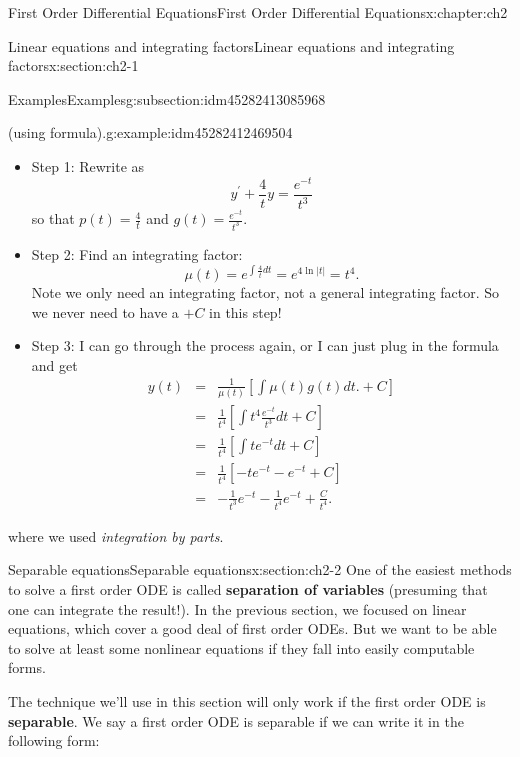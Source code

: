 \documentclass[oneside,10pt,]{book}
\newcommand{\terminology}[1]{\textbf{#1}}
\numberwithin{equation}{section}
\numberwithin{equation}{section}
\newcommand{\amp}{&}
\begin{document}
\begin{chapterptx}{First Order Differential Equations}{}{First Order Differential Equations}{}{}{x:chapter:ch2}
\begin{sectionptx}{Linear equations and integrating factors}{}{Linear equations and integrating factors}{}{}{x:section:ch2-1}
\begin{subsectionptx}{Examples}{}{Examples}{}{}{g:subsection:idm45282413085968}
\begin{example}{(using formula).}{g:example:idm45282412469504}
%
%
\begin{itemize}[label=\textbullet]
\item{}Step 1: Rewrite as%
\begin{equation*}
y^{\prime}+\frac{4}{t}y=\frac{e^{-t}}{t^{3}}
\end{equation*}
so that \(p(t)=\frac{4}{t}\) and \(g(t)=\frac{e^{-t}}{t^{3}}\).%
\item{}Step 2: Find an integrating factor:%
\begin{equation*}
\mu(t)=e^{\int\frac{4}{t}dt}=e^{4\ln\left|t\right|}=t^{4}.
\end{equation*}
Note we only need an integrating factor, not a general integrating factor. So we never need to have a \(+C\) in this step!%
\item{}Step 3: I can go through the process again, or I can just plug in the formula and get%
\begin{align*}
y(t) \amp = \amp \frac{1}{\mu(t)}\left[\int\mu(t)g(t)dt.+C\right]\\
\amp = \amp \frac{1}{t^{4}}\left[\int t^{4}\frac{e^{-t}}{t^{3}}dt+C\right]\\
\amp = \amp \frac{1}{t^{4}}\left[\int te^{-t}dt+C\right]\\
\amp = \amp \frac{1}{t^{4}}\left[-te^{-t}-e^{-t}+C\right]\\
\amp = \amp -\frac{1}{t^{3}}e^{-t}-\frac{1}{t^{4}}e^{-t}+\frac{C}{t^{4}}.
\end{align*}
%
\end{itemize}
 where we used \emph{integration by parts}.\end{example}
\end{subsectionptx}
\end{sectionptx}
%
%
\typeout{************************************************}
\typeout{************************************************}
%
\begin{sectionptx}{Separable equations}{}{Separable equations}{}{}{x:section:ch2-2}
One of the easiest methods to solve a first order ODE is called \terminology{separation of variables} (presuming that one can integrate the result!). In the previous section, we focused on linear equations, which cover a good deal of first order ODEs. But we want to be able to solve at least some nonlinear equations if they fall into easily computable forms.%
\par
The technique we'll use in this section will only work if the first order ODE is \terminology{separable}. We say a first order ODE is separable if we can write it in the following form:%

\end{sectionptx}
\end{chapterptx}
\end{document}
